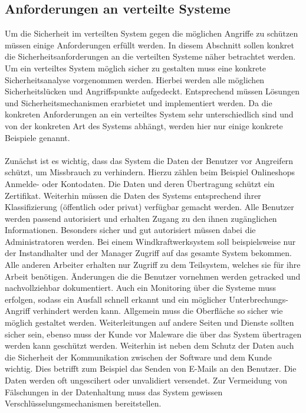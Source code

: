 \documentclass[utf8,biblatex]{lni}
\begin{document}
\subsection{Anforderungen an verteilte Systeme}
Um die Sicherheit im verteilten System gegen die möglichen Angriffe zu schützen müssen einige Anforderungen erfüllt werden. In diesem Abschnitt sollen
konkret die Sicherheitsanforderungen an die verteilten Systeme näher betrachtet werden. Um ein verteiltes System möglich sicher zu gestalten muss eine konkrete Sicherheitsanalyse vorgenommen werden. Hierbei werden alle möglichen Sicherheitslücken und Angriffspunkte aufgedeckt. 
Entsprechend müssen Lösungen und Sicherheitsmechanismen erarbietet und implementiert werden. Da die konkreten Anforderungen an ein verteiltes System sehr unterschiedlich sind und von der konkreten Art des Systems abhängt, werden hier nur einige konkrete Beispiele genannt.
\\\\
Zunächst ist es wichtig, dass das System die Daten der Benutzer vor Angreifern schützt, um Missbrauch zu verhindern. Hierzu zählen beim Beispiel Onlineshops Anmelde- oder Kontodaten. Die Daten und deren Übertragung
schützt ein Zertifikat.
\newline
Weiterhin müssen die Daten des Systems entsprechend ihrer Klassifizierung (öffentlich oder privat) verfügbar gemacht werden. Alle Benutzer werden passend autorisiert und erhalten Zugang zu den ihnen zugänglichen Informationen. Besonders sicher und gut autorisiert müssen dabei die Administratoren werden.
Bei einem Windkraftwerksystem soll beispielsweise nur der Instandhalter und der Manager Zugriff auf das gesamte System bekommen. Alle anderen Arbeiter erhalten nur Zugriff zu dem Teilsystem, welches sie für ihre Arbeit benötigen.
 Änderungen die die Benutzer vornehmen
werden getracked und nachvollziehbar dokumentiert. Auch ein Monitoring über die Systeme muss erfolgen, sodass ein Ausfall schnell erkannt und ein möglicher Unterbrechungs-Angriff verhindert werden kann.
Allgemein muss die Oberfläche so sicher wie möglich gestaltet werden. Weiterleitungen auf andere Seiten und Dienste sollten sicher sein, ebenso muss der Kunde vor Maleware die über das System
übertragen werden kann geschützt werden.
Weiterhin ist neben dem Schutz der Daten auch die Sicherheit der Kommunikation zwischen der Software und dem Kunde wichtig. Dies betrifft zum Beispiel das Senden von E-Mails an den Benutzer. Die Daten werden oft ungescihert
oder unvalidiert versendet. 
Zur Vermeidung von Fälschungen in der Datenhaltung muss das System gewissen Verschlüsselungsmechanismen bereitstellen. 
\citet{Kriha.2008}
\end{document}

